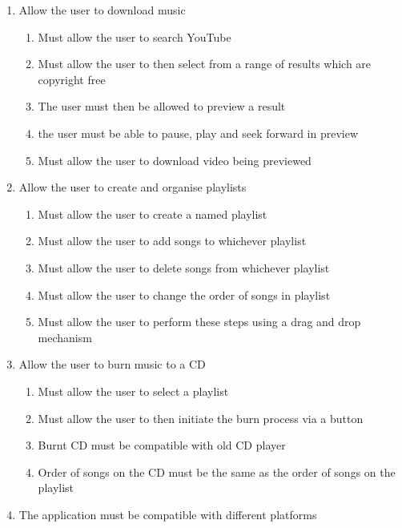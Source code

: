 \documentclass{article}
\begin{document}
\begin{enumerate}
    \item Allow the user to download music

    \begin{enumerate}
        \item Must allow the user to search YouTube
        \item Must allow the user to then select from a range of results which are copyright free
        \item The user must then be allowed to preview a result
        \item the user must be able to pause, play and seek forward in preview
        \item Must allow the user to download video being previewed
    \end{enumerate}

    \item Allow the user to create and organise playlists

    \begin{enumerate}
        \item Must allow the user to create a named playlist
        \item Must allow the user to add songs to whichever playlist
        \item Must allow the user to delete songs from whichever playlist
        \item Must allow the user to change the order of songs in playlist
        \item Must allow the user to perform these steps using a drag and drop mechanism
    \end{enumerate}

    \item Allow the user to burn music to a CD

    \begin{enumerate}
        \item Must allow the user to select a playlist
        \item Must allow the user to then initiate the burn process via a button
        \item Burnt CD must be compatible with old CD player
        \item Order of songs on the CD must be the same as the order of songs on the playlist
    \end{enumerate}

    \item The application must be compatible with different platforms

\end{enumerate}
\end{document}
